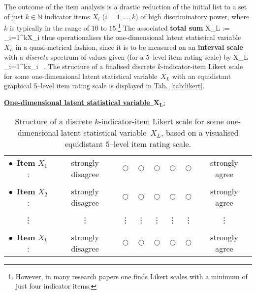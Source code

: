 \medskip
\noindent
The outcome of the item analysis is a drastic reduction of the 
initial list to a set of just $k \in \mathbb{N}$ indicator items 
$X_{i}$ ($i=1,\ldots,k$) of high discriminatory power, where $k$ 
is typically in the range of $10$ to $15$.\footnote{However, in 
many research papers one finds Likert scales with a minimum of 
just four indicator items.} The associated \textbf{total sum}
%
\be 
X_{L} := \sum_{i=1}^{k}X_{i}
\ee
%
thus operationalises the one-dimensional latent statistical 
variable~$X_{L}$ in a quasi-metrical fashion, since it is to be 
measured on an \textbf{interval scale} with a \textit{discrete} 
spectrum of values given (for a 5--level item rating scale) by
%
\be
X_{L} \mapsto \sum_{i=1}^{k}x_{i} \in \left[1k,5k\right] \ .
\ee
%
The structure of a finalised discrete $k$-indicator-item Likert 
scale for some one-dimensional latent statistical variable~$X_{L}$ 
with an equidistant graphical 5--level item rating scale is 
displayed in Tab.~\ref{tab:likert}.
%
\begin{table}

\underline{\textbf{One-dimensional latent statistical
variable}~$\boldsymbol{X_{L}}$:}
%
\begin{center}
\begin{tabular}[!htb]{cccccccc}
$\bullet$\ \textbf{Item} $X_{1}$: &
strongly disagree & $\bigcirc$\quad\quad\mbox{} 
& $\bigcirc$\quad\quad\mbox{} & $\bigcirc$\quad\quad\mbox{} & 
$\bigcirc$\quad\quad\mbox{} & $\bigcirc$ & strongly agree \\ \\
$\bullet$\ \textbf{Item} $X_{2}$: &
strongly disagree & $\bigcirc$\quad\quad\mbox{} 
& $\bigcirc$\quad\quad\mbox{} & $\bigcirc$\quad\quad\mbox{} & 
$\bigcirc$\quad\quad\mbox{} & $\bigcirc$ & strongly agree \\ \\
\vdots & \vdots & \vdots\quad\quad\mbox{} & 
\vdots\quad\quad\mbox{} & \vdots\quad\quad\mbox{} & 
\vdots\quad\quad\mbox{} & \vdots & \vdots\\ \\
$\bullet$\ \textbf{Item} $X_{k}$: & 
strongly disagree & $\bigcirc$\quad\quad\mbox{} 
& $\bigcirc$\quad\quad\mbox{} & $\bigcirc$\quad\quad\mbox{} & 
$\bigcirc$\quad\quad\mbox{} & $\bigcirc$ & strongly agree
\end{tabular}
\end{center}
\caption{Structure of a discrete $k$-indicator-item Likert scale 
for some one-dimensional latent statistical variable~$X_{L}$, 
based on a visualised equidistant 5--level item rating scale.}
\end{table}
%

